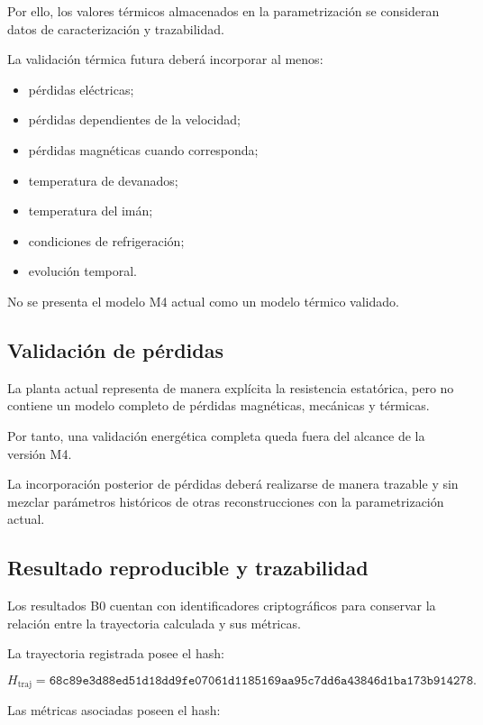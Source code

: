 Por ello, los valores térmicos almacenados en la parametrización se consideran datos de caracterización y trazabilidad.

La validación térmica futura deberá incorporar al menos:

\begin{itemize}
    \item pérdidas eléctricas;
    \item pérdidas dependientes de la velocidad;
    \item pérdidas magnéticas cuando corresponda;
    \item temperatura de devanados;
    \item temperatura del imán;
    \item condiciones de refrigeración;
    \item evolución temporal.
\end{itemize}

No se presenta el modelo M4 actual como un modelo térmico validado.

\subsection{Validación de pérdidas}

La planta actual representa de manera explícita la resistencia estatórica, pero no contiene un modelo completo de pérdidas magnéticas, mecánicas y térmicas.

Por tanto, una validación energética completa queda fuera del alcance de la versión M4.

La incorporación posterior de pérdidas deberá realizarse de manera trazable y sin mezclar parámetros históricos de otras reconstrucciones con la parametrización actual.

\subsection{Resultado reproducible y trazabilidad}

Los resultados B0 cuentan con identificadores criptográficos para conservar la relación entre la trayectoria calculada y sus métricas.

La trayectoria registrada posee el hash:

\begin{equation}
H_{\mathrm{traj}}
=
\texttt{68c89e3d88ed51d18dd9fe07061d1185169aa95c7dd6a43846d1ba173b914278}.
\end{equation}

Las métricas asociadas poseen el hash:

